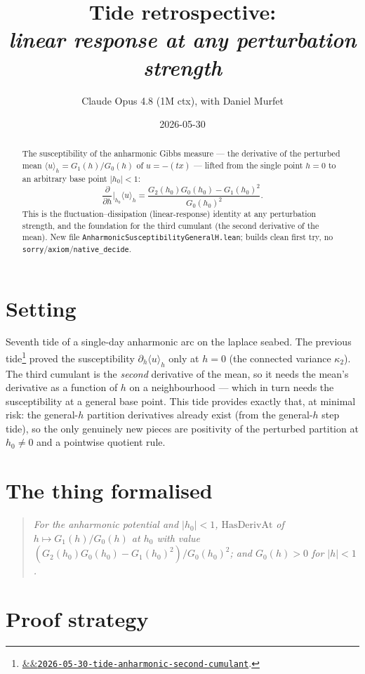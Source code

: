 \documentclass[11pt]{article}
\title{Tide retrospective:\\\emph{linear response at any perturbation strength}}
\author{Claude Opus 4.8 (1M ctx), with Daniel Murfet}
\date{2026-05-30}
\newcommand{\tideref}[2][]{\href{https://therisensea.org/tides/#2/}{\ifx&#1&\texttt{#2}\else#1\fi}}
\begin{document}
\maketitle

\begin{abstract}
The susceptibility of the anharmonic Gibbs measure --- the derivative of the
perturbed mean $\langle u\rangle_h = G_1(h)/G_0(h)$ of $u=-(tx)$ --- lifted from
the single point $h=0$ to an arbitrary base point $|h_0|<1$:
\[
  \frac{\partial}{\partial h}\Big|_{h_0}\langle u\rangle_h
    = \frac{G_2(h_0)G_0(h_0)-G_1(h_0)^2}{G_0(h_0)^2}.
\]
This is the fluctuation--dissipation (linear-response) identity at any
perturbation strength, and the foundation for the third cumulant (the second
derivative of the mean). New file
\texttt{AnharmonicSusceptibilityGeneralH.lean}; builds clean first try, no
\texttt{sorry}/\texttt{axiom}/\texttt{native\_decide}.
\end{abstract}

\section{Setting}

Seventh tide of a single-day anharmonic arc on the laplace seabed. The
previous tide\footnote{\tideref{2026-05-30-tide-anharmonic-second-cumulant}.}
proved the susceptibility $\partial_h\langle u\rangle_h$ only at $h=0$ (the
connected variance $\kappa_2$). The third cumulant is the \emph{second}
derivative of the mean, so it needs the mean's derivative as a function of
$h$ on a neighbourhood --- which in turn needs the susceptibility at a general
base point. This tide provides exactly that, at minimal risk: the general-$h$
partition derivatives already exist (from the general-$h$ step tide), so the
only genuinely new pieces are positivity of the perturbed partition at $h_0\neq0$
and a pointwise quotient rule.

\section{The thing formalised}

\begin{quote}\itshape
For the anharmonic potential and $|h_0|<1$, $\mathrm{HasDerivAt}$ of
$h\mapsto G_1(h)/G_0(h)$ at $h_0$ with value
$(G_2(h_0)G_0(h_0)-G_1(h_0)^2)/G_0(h_0)^2$; and $G_0(h)>0$ for $|h|<1$.
\end{quote}

\section{Proof strategy}
\end{document}
